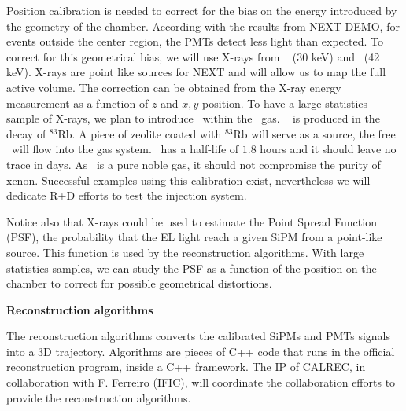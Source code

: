 Position calibration is needed to correct for the bias on the energy introduced by the geometry of the chamber. According with the results from NEXT-DEMO, for events outside the center region, the PMTs detect less light than expected. To correct for this geometrical bias, we will use X-rays from \Xe ~ (30 keV)  and \KR ~(42 keV). X-rays are point like sources for NEXT and will allow us to map the full active volume. The correction can be obtained from the X-ray energy measurement as a function of $z$ and $x,y$ position. 
To have a large statistics sample of X-rays, we plan to introduce \KR ~within the \Xe ~gas.  
\KR~ is produced in the decay of $^{83}$Rb. A piece of zeolite coated with $^{83}$Rb will serve as a source, the free \KR ~will flow into the gas system. \KR ~has a half-life of $1.8 $ hours and it should leave no trace in days. As \KR ~is a pure noble gas, it should not compromise the purity of xenon. 
Successful examples using this calibration exist, nevertheless we will dedicate R+D efforts to test the injection system.

Notice also that X-rays could be used to estimate the Point Spread Function (PSF), the probability that the EL light reach a given SiPM from a point-like source. This function is used by the reconstruction algorithms. With large statistics samples, we can study the PSF as a function of the position on the chamber to correct for possible geometrical distortions. 
 
{\bf Reconstruction algorithms}

The reconstruction algorithms converts the calibrated SiPMs and PMTs signals into a 3D trajectory. 
Algorithms are pieces of C++ code that runs in the official reconstruction program, inside a C++ framework.
The IP of CALREC, in collaboration with F. Ferreiro (IFIC), will coordinate the collaboration efforts to provide the reconstruction algorithms.

